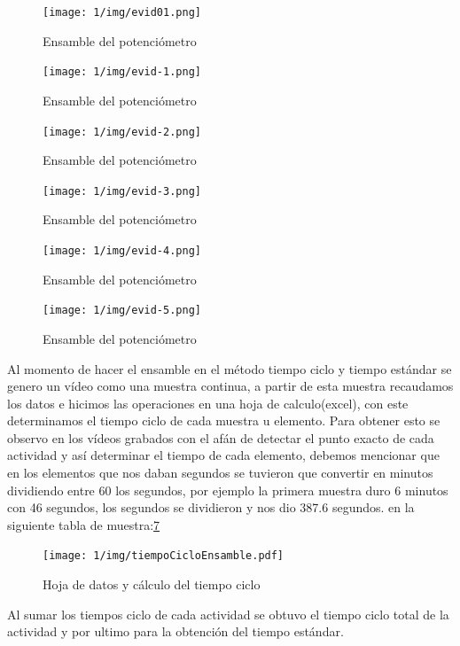      \begin{figure}[H]
            \centering
            \texttt{[image: 1/img/evid01.png]}
            \caption{Ensamble del potenciómetro}
            \label{fig:evid01}
        \end{figure}
     \begin{figure}[H]
            \centering
            \texttt{[image: 1/img/evid-1.png]}
            \caption{Ensamble del potenciómetro}
            \label{fig:evid-1}
        \end{figure}
     \begin{figure}[H]
            \centering
            \texttt{[image: 1/img/evid-2.png]}
            \caption{Ensamble del potenciómetro}
            \label{fig:evid-2}
        \end{figure}
     \begin{figure}[H]
            \centering
            \texttt{[image: 1/img/evid-3.png]}
            \caption{Ensamble del potenciómetro}
            \label{fig:evid-3}
        \end{figure}
     \begin{figure}[H]
            \centering
            \texttt{[image: 1/img/evid-4.png]}
            \caption{Ensamble del potenciómetro}
            \label{fig:evid-4}
        \end{figure}
    \begin{figure}[H]
            \centering
            \texttt{[image: 1/img/evid-5.png]}
            \caption{Ensamble del potenciómetro}
            \label{fig:evid-5}
        \end{figure}
    Al momento de hacer el ensamble en el método tiempo ciclo y tiempo estándar se genero un vídeo como una muestra continua, a partir de esta muestra recaudamos los datos e hicimos las operaciones en una hoja de calculo(excel), con este determinamos el tiempo ciclo de cada muestra u elemento. Para obtener esto se observo en los vídeos grabados con el afán de detectar el punto exacto de cada actividad y así determinar el tiempo de cada elemento, debemos mencionar que en los elementos que nos daban segundos se tuvieron que convertir en minutos dividiendo entre 60  los segundos, por ejemplo la primera muestra duro 6 minutos con 46 segundos, los segundos se dividieron y nos dio 387.6 segundos.
    en la siguiente tabla de muestra:\ref{fig:tiempoCicloEnsamble}
        
    \begin{figure}[H]
            \centering
            \texttt{[image: 1/img/tiempoCicloEnsamble.pdf]}
            \caption{Hoja de datos y cálculo del tiempo ciclo}
            \label{fig:tiempoCicloEnsamble}
        \end{figure}
    Al sumar los tiempos ciclo de cada actividad se obtuvo el tiempo ciclo total de la actividad y por ultimo para la obtención del tiempo estándar.
    
